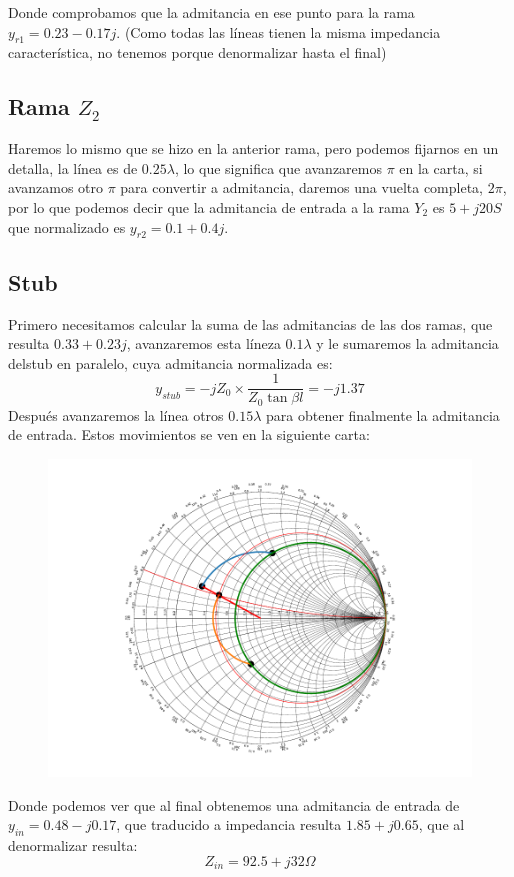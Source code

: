 Donde comprobamos que la admitancia en ese punto para la rama $y_{r1} = 0.23 - 0.17j$. (Como todas las líneas tienen la misma impedancia característica, no tenemos porque denormalizar hasta el final)

\subsection{Rama $Z_2$}
Haremos lo mismo que se hizo en la anterior rama, pero podemos fijarnos en un detalla, la línea es de $0.25\lambda$, lo que significa que avanzaremos $\pi$ en la carta, si avanzamos otro $\pi$ para convertir a admitancia, daremos una vuelta completa, $2\pi$, por lo que podemos decir que la admitancia de entrada a la rama $Y_2$ es $5+j20 S$ que normalizado es $y_{r2} =0.1 + 0.4j$.

\subsection{Stub}
Primero necesitamos calcular la suma de las admitancias de las dos ramas, que resulta
$0.33 + 0.23j$, avanzaremos esta líneza $0.1\lambda$ y le sumaremos la admitancia delstub en paralelo, cuya admitancia normalizada es:
\[ y_{stub} = -j Z_0 \times \frac{1}{Z_0 \tan{\beta l}} = -j1.37 \]
Después avanzaremos la línea otros $0.15\lambda$ para obtener finalmente la admitancia de entrada. Estos movimientos se ven en la siguiente carta:
\begin{figure}[h]
  \centering
  \includegraphics[scale = 0.75]{ej10/images/out2.pdf}
  \label{ej2smith}
\end{figure}
Donde podemos ver que al final obtenemos una admitancia de entrada de $y_{in} = 0.48 - j0.17$, que traducido a impedancia resulta $1.85 + j0.65$, que al denormalizar resulta:
\[Z_{in} =92.5 + j32\Omega \]

